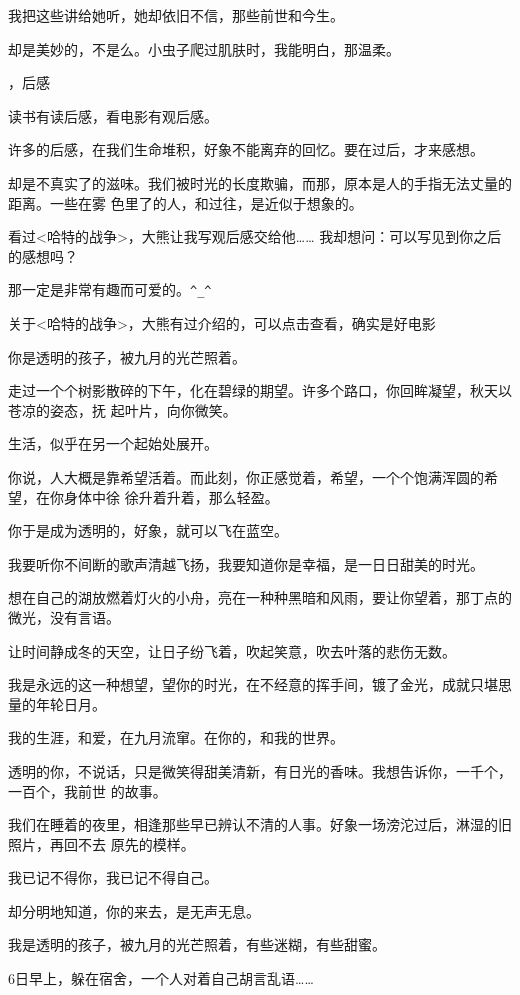 \documentclass[12pt,a4paper]{article}
\newcommand{\subpart}[1]{
	\begingroup \par
	\vspace{1ex} \centering #1
	\par \endgroup \nopagebreak[4]
}
\begin{document}
		我把这些讲给她听，她却依旧不信，那些前世和今生。

		却是美妙的，不是么。小虫子爬过肌肤时，我能明白，那温柔。


	\subpart{4，后感}

		读书有读后感，看电影有观后感。

		许多的后感，在我们生命堆积，好象不能离弃的回忆。要在过后，才来感想。

		却是不真实了的滋味。我们被时光的长度欺骗，而那，原本是人的手指无法丈量的距离。一些在雾
	色里了的人，和过往，是近似于想象的。

		看过<哈特的战争>，大熊让我写观后感交给他…… 我却想问：可以写见到你之后的感想吗？

		那一定是非常有趣而可爱的。\verb|^_^|

		关于<哈特的战争>，大熊有过介绍的，可以点击查看，确实是好电影


	\endwriting



		你是透明的孩子，被九月的光芒照着。

		走过一个个树影散碎的下午，化在碧绿的期望。许多个路口，你回眸凝望，秋天以苍凉的姿态，抚
	起叶片，向你微笑。

		生活，似乎在另一个起始处展开。

		你说，人大概是靠希望活着。而此刻，你正感觉着，希望，一个个饱满浑圆的希望，在你身体中徐
	徐升着升着，那么轻盈。

		你于是成为透明的，好象，就可以飞在蓝空。

		我要听你不间断的歌声清越飞扬，我要知道你是幸福，是一日日甜美的时光。

		想在自己的湖放燃着灯火的小舟，亮在一种种黑暗和风雨，要让你望着，那丁点的微光，没有言语。

		让时间静成冬的天空，让日子纷飞着，吹起笑意，吹去叶落的悲伤无数。

		我是永远的这一种想望，望你的时光，在不经意的挥手间，镀了金光，成就只堪思量的年轮日月。

		我的生涯，和爱，在九月流窜。在你的，和我的世界。

		透明的你，不说话，只是微笑得甜美清新，有日光的香味。我想告诉你，一千个，一百个，我前世
	的故事。

		我们在睡着的夜里，相逢那些早已辨认不清的人事。好象一场滂沱过后，淋湿的旧照片，再回不去
	原先的模样。

		我已记不得你，我已记不得自己。\par
		却分明地知道，你的来去，是无声无息。\par
		我是透明的孩子，被九月的光芒照着，有些迷糊，有些甜蜜。\par
		6日早上，躲在宿舍，一个人对着自己胡言乱语……
\end{document}
